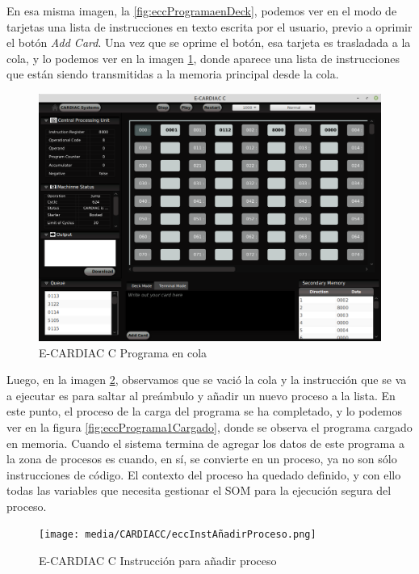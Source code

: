 \documentclass[letterpaper,12pt,oneside]{book}
\begin{document}
			En esa misma imagen, la \ref{fig:eccProgramaenDeck}, podemos ver en el modo de tarjetas una lista de instrucciones en texto
			escrita por el usuario,
			previo a oprimir el botón \textit{Add Card}. Una vez que se oprime el botón, esa tarjeta es trasladada a la
			cola, y lo podemos ver en la imagen \ref{fig:eccProgramaEnCola}, donde aparece una lista de instrucciones que están siendo transmitidas a la 
			memoria principal desde la cola.

		\begin{figure}[h]		
			\centering
			\includegraphics[scale=0.4]{media/CARDIACC/eccProgramaenCola.png}
			\caption{E-CARDIAC C Programa en cola}
			\label{fig:eccProgramaEnCola}
		\end{figure}	
		
		Luego, en la imagen \ref{fig:eccAddNewProcesInst}, observamos que se vació la cola y la instrucción que se va a ejecutar 
		es para saltar al preámbulo y añadir un nuevo proceso a la lista. En este punto, el proceso de la carga del programa se ha completado,
		y lo podemos ver en la figura \ref{fig:eccPrograma1Cargado}, donde se observa el programa cargado en
		memoria. Cuando el sistema termina de agregar los datos de este
		programa a la zona de procesos es cuando, en sí, se convierte en un proceso, ya no son sólo instrucciones de código. El contexto del proceso ha 
		quedado definido,
		y con ello todas las variables que necesita gestionar el SOM para la ejecución segura del proceso.
        \begin{figure}[h]		
			\centering
			\texttt{[image: media/CARDIACC/eccInstAñadirProceso.png]}
			\caption{E-CARDIAC C Instrucción para añadir proceso}
			\label{fig:eccAddNewProcesInst}
		\end{figure}
\end{document}

